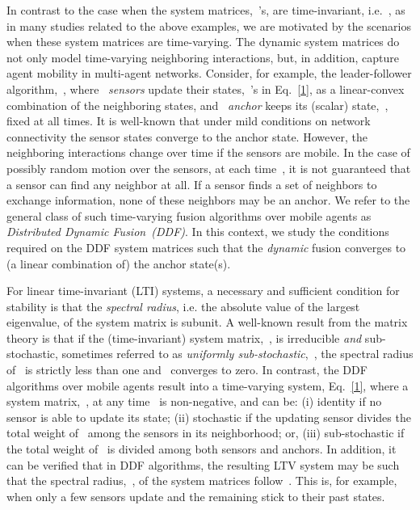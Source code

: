\documentclass[draftclsnofoot, onecolumn, 12pt]{IEEEtran}
\begin{document}
In contrast to the case when the system matrices,~'s, are time-invariant, i.e.~, as in many studies related to the above examples, we are motivated by the scenarios when these system matrices are time-varying. The dynamic system matrices do not only model time-varying neighboring interactions, but, in addition, capture agent mobility in multi-agent networks. Consider, for example, the leader-follower algorithm,~\cite{tanner02,4200874}, where~ \emph{sensors} update their states,~'s in Eq.~\eqref{1}, as a linear-convex combination of the neighboring states, and~ \emph{anchor} keeps its (scalar) state,~, fixed at all times. It is well-known that under mild conditions on network connectivity the sensor states converge to the anchor state. However, the neighboring interactions change over time if the sensors are  mobile. In the case of possibly random motion over the sensors, at each time~, it is not guaranteed that a sensor can find any neighbor at all. If a sensor finds a set of neighbors to exchange information, none of these neighbors may be an anchor. We refer to the general class of such time-varying fusion algorithms over mobile agents as \emph{Distributed Dynamic Fusion~(DDF)}. In this context, we study the conditions required on the DDF system matrices such that the \emph{dynamic} fusion converges to (a linear combination of) the anchor state(s).

For linear time-invariant (LTI) systems, a necessary and sufficient condition for stability is that the \textit{spectral radius}, i.e. the absolute value of the largest eigenvalue, of the system matrix is subunit. A well-known result from the matrix theory is that if the (time-invariant) system matrix,~, is irreducible \textit{and} sub-stochastic, sometimes referred to as \emph{uniformly sub-stochastic},~\cite{kolpakov,kolpakov_rus:83}, the spectral radius of~ is strictly less than one and~ converges to zero. In contrast, the DDF algorithms over mobile agents result into a time-varying system, Eq.~\eqref{1}, where a system matrix,~, at any time~ is non-negative, and can be: (i) identity if no sensor is able to update its state; (ii) stochastic if the updating sensor divides the total weight of~ among the sensors in its neighborhood; or, (iii) sub-stochastic if the total weight of~ is divided among both sensors and anchors. In addition, it can be verified that in DDF algorithms, the resulting LTV system may be such that the spectral radius,~, of the system matrices follow~. This is, for example, when only a few sensors update and the remaining stick to their past states. 
 
\end{document}
